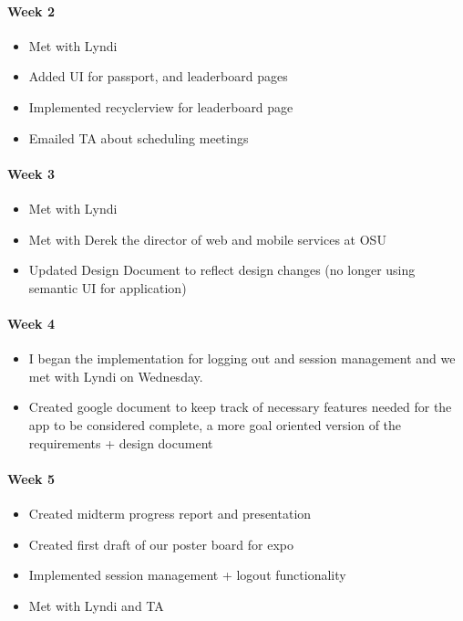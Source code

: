 \documentclass[onecolumn, draftclsnofoot,10pt, compsoc]{IEEEtran}
\begin{document}
      \paragraph{Week 2}
        \begin{itemize}
          \item Met with Lyndi
          \item Added UI for passport, and leaderboard pages
          \item Implemented recyclerview for leaderboard page
          \item Emailed TA about scheduling meetings
        \end{itemize}

      \paragraph{Week 3}
        \begin{itemize}
          \item Met with Lyndi
          \item Met with Derek the director of web and mobile services at OSU
          \item Updated Design Document to reflect design changes (no longer using semantic UI for application)
        \end{itemize}

      \paragraph{Week 4}
        \begin{itemize}
          \item I began the implementation for logging out and session management and we met with Lyndi on Wednesday.
          \item Created google document to keep track of necessary features needed for the app to be considered complete, a more goal oriented version of the requirements + design document
        \end{itemize}

      \paragraph{Week 5}
        \begin{itemize}
          \item Created midterm progress report and presentation
          \item Created first draft of our poster board for expo
          \item Implemented session management + logout functionality
          \item Met with Lyndi and TA
        \end{itemize}
\end{document}
